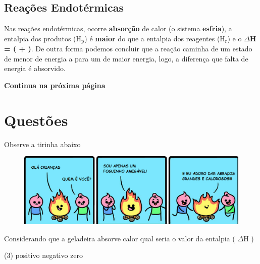 \documentclass[11pt]{article}
\begin{document}
\begin{multicols}{2}
\section{Reações  Endotérmicas}
\label{sec:orgaa0cbb7}
Nas reações endotérmicas, ocorre \textbf{absorção} de calor (o sistema \textbf{esfria}), a entalpia dos produtos (\(\mathrm{H_p}\)) é \textbf{maior} do que a entalpia dos reagentes (\(\mathrm{H_r}\)) e o  \textbf{\(\Delta\)H = ( + )}. De outra forma podemos concluir que a reação caminha de um estado de menor de energia a para um de maior energia, logo, a diferença que falta de energia é absorvido.

\end{multicols}
\vspace{1cm}
{\bfseries Continua na próxima página}


\newpage
\section*{Questões}


\begin{exercise}
Observe a tirinha abaixo

\begin{figure}[ht]
\centering
\includegraphics[scale=0.3]{Adaptadas/fogo2.png}
\end{figure}

Considerando que a geladeira absorve calor qual seria o valor da entalpia ( $\Delta$H )

\begin{choice}(3)
\choice positivo
\choice negativo
\choice zero
\end{choice}
\end{exercise}
\end{document}
